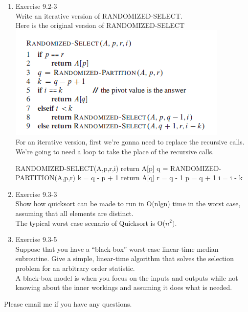 \documentclass[12pt]{article}
\begin{document}
\begin{enumerate}
\item Exercise 9.2-3 \\
Write an iterative version of RANDOMIZED-SELECT. \\
Here is the original version of RANDOMIZED-SELECT\\
\includegraphics[scale=1]{Randomselect.png}
\\
For an iterative version, first we're gonna need to replace the recursive calls. We're going to need a loop to take the place of the recursive calls.

\begin{algorithmic}
\STATE RANDOMIZED-SELECT(A,p,r,i)
\WHILE{}
\STATE return A[p]
\ENDIF
\STATE q = RANDOMIZED-PARTITION(A,p,r)
\STATE k = q - p + 1
\STATE return A[q]
\STATE r = q - 1
\ELSE
\STATE p = q + 1
\STATE i = i - k
\ENDIF
\ENDWHILE
\end{algorithmic}

\item Exercise 9.3-3 \\
Show how quicksort can be made to run in O(nlgn) time in the worst case, assuming
that all elements are distinct.\\

The typical worst case scenario of Quicksort is O($n^2)$. 


\item Exercise 9.3-5 \\
Suppose that you have a “black-box” worst-case linear-time median subroutine.
Give a simple, linear-time algorithm that solves the selection problem for an arbitrary
order statistic. \\

A black-box model is when you focus on the inputs and outputs while not knowing about the inner workings and assuming it does what is needed. 

\end{enumerate}
 
 
 Please email me if you have any questions.

 
\end{document}
